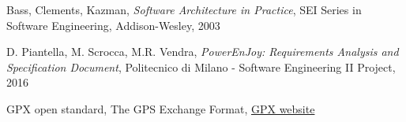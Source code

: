 \begin{thebibliography}{9}

Bass, Clements, Kazman, \emph{Software Architecture in Practice}, SEI Series in Software Engineering, Addison-­Wesley, 2003

D. Piantella, M. Scrocca, M.R. Vendra, \emph{PowerEnJoy: Requirements Analysis and Specification Document}, Politecnico di Milano - Software Engineering II Project, 2016

GPX open standard, The GPS Exchange Format, \href{http://www.topografix.com/gpx.asp}{GPX website}
\end{thebibliography}
